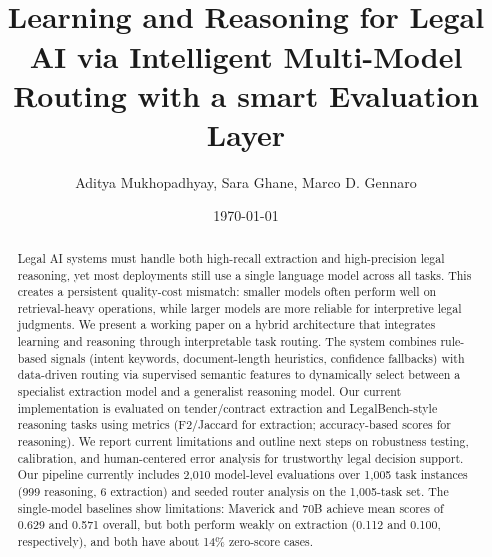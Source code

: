 \documentclass[11pt,a4paper]{article}
\title{\textbf{}\\
Learning and Reasoning for Legal AI via Intelligent Multi-Model Routing with a smart Evaluation Layer}
\author{Aditya Mukhopadhyay, Sara Ghane, Marco D. Gennaro}
\date{\today}
\begin{document}
\maketitle
\onehalfspacing

\begin{abstract}
Legal AI systems must handle both high-recall extraction and high-precision legal reasoning, yet most deployments still use a single language model across all tasks. This creates a persistent quality-cost mismatch: smaller models often perform well on retrieval-heavy operations, while larger models are more reliable for interpretive legal judgments. We present a working paper on a hybrid architecture that integrates learning and reasoning through interpretable task routing. The system combines rule-based signals (intent keywords, document-length heuristics, confidence fallbacks) with data-driven routing via supervised semantic features to dynamically select between a specialist extraction model and a generalist reasoning model. Our current implementation is evaluated on tender/contract extraction and LegalBench-style reasoning tasks using metrics (F2/Jaccard for extraction; accuracy-based scores for reasoning). We report current limitations and outline next steps on robustness testing, calibration, and human-centered error analysis for trustworthy legal decision support. Our pipeline currently includes 2,010 model-level evaluations over 1,005 task instances (999 reasoning, 6 extraction) and seeded router analysis on the 1,005-task set. The single-model baselines show limitations: Maverick and 70B achieve mean scores of 0.629 and 0.571 overall, but both perform weakly on extraction (0.112 and 0.100, respectively), and both have about 14\% zero-score cases.
\end{abstract}
\end{document}
